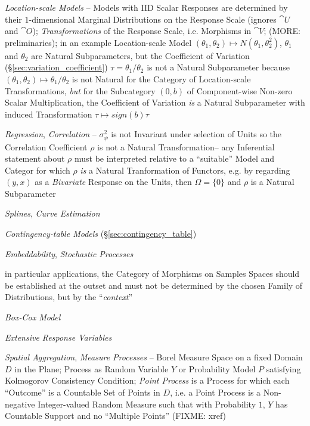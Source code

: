 \emph{Location-scale Models} -- Models with IID Scalar Responses are determined
by their $1$-dimensional Marginal Distributions on the Response Scale (ignores
$\cat{U}$ and $\cat{O}$); \emph{Transformations} of the Response Scale, i.e.
Morphisms in $\cat{V}$; (MORE: preliminaries); in an example Location-scale
Model $(\theta_1, \theta_2) \mapsto N(\theta_1, \theta_2^2)$, $\theta_1$ and
$\theta_2$ are Natural Subparameters, but the Coefficient of Variation
(\S\ref{sec:variation_coefficient}) $\tau = \theta_1 / \theta_2$ is not
a Natural Subparameter because
$(\theta_1, \theta_2) \mapsto \theta_1 / \theta_2$ is not Natural for the
Category of Location-scale Transformations, \emph{but} for the Subcategory
$(0, b)$ of Component-wise Non-zero Scalar Multiplication, the Coefficient of
Variation \emph{is} a Natural Subparameter with induced Transformation
$\tau \mapsto sign(b) \tau$

\emph{Regression}, \emph{Correlation} -- $\sigma^2_\psi$ is not Invariant under
selection of Units so the Correlation Coefficient $\rho$ is not a Natural
Transformation-- any Inferential statement about $\rho$ must be interpreted
relative to a ``suitable'' Model and Categor for which $\rho$ \emph{is} a
Natural Tranformation of Functors, e.g. by regarding $(y, x)$ as a
\emph{Bivariate} Response on the Units, then $\Omega = \{ 0 \}$ and $\rho$ is a
Natural Subparameter

\emph{Splines}, \emph{Curve Estimation}

\emph{Contingency-table Models} (\S\ref{sec:contingency_table})

\emph{Embeddability}, \emph{Stochastic Processes}

in particular applications, the Category of Morphisms on Samples Spaces should
be established at the outset and must not be determined by the chosen
Family of Distributions, but by the ``\emph{context}''

\emph{Box-Cox Model}

\emph{Extensive Response Variables}

\emph{Spatial Aggregation}, \emph{Measure Processes} -- Borel Measure Space on a
fixed Domain $D$ in the Plane; Process as Random Variable $Y$ or Probability
Model $P$ satisfying Kolmogorov Consistency Condition; \emph{Point Process} is a
Process for which each ``Outcome'' is a Countable Set of Points in $D$, i.e. a
Point Process is a Non-negative Integer-valued Random Measure such that with
Probability $1$, $Y$ has Countable Support and no ``Multiple Points'' (FIXME:
xref)

